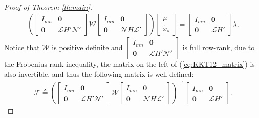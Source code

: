 \documentclass[12pt]{article}  %
\newcommand{\Fc}{{\mathcal{F}}}
\newcommand{\Nc}{{\mathcal{N}}}
\newcommand{\Wc}{{\mathcal{W}}}
\newcommand{\Lc}{{\mathcal{L}}}
\newtheorem*{proof}{\textbf{Proof}}
\begin{document}
\begin{proof}[Proof of Theorem \ref{th:main}]
\begin{align}
	\left(
	\begin{bmatrix}
	I_{mn} & \mathbf{0} \\
	\mathbf{0}  &  \Lc H{'} \Nc{'}
	\end{bmatrix}
	\Wc
	\begin{bmatrix}
	I_{mn} & \mathbf{0} \\
	\mathbf{0}  &  \Nc H \Lc{'}
	\end{bmatrix}
	\right)
	\begin{bmatrix}
	\mu \\ \tilde{x}_s
	\end{bmatrix}=
	\begin{bmatrix}
	I_{mn} & \mathbf{0} \\
	\mathbf{0}  &  \Lc H{'}
	\end{bmatrix}
	\lambda .
	\end{align}
	Notice that $\Wc$ is positive definite and $\begin{bmatrix}
	I_{mn} & \mathbf{0} \\
	\mathbf{0}  &  \Lc H{'} \Nc{'}
	\end{bmatrix}$
	is full row-rank,
	due to the Frobenius rank inequality, the matrix on the left of (\ref{eq:KKT12_matrix}) is also invertible, and thus the following matrix is well-defined:
	\begin{align}\label{eq:def_H}
	\Fc	\triangleq
	\left(
	\begin{bmatrix}
	I_{mn} & \mathbf{0} \\
	\mathbf{0}  &  \Lc H{'} \Nc{'}
	\end{bmatrix}
	\Wc
	\begin{bmatrix}
	I_{mn} & \mathbf{0} \\
	\mathbf{0}  &  \Nc H \Lc{'}
	\end{bmatrix}
	\right)^{-1}
	\begin{bmatrix}
	I_{mn} & \mathbf{0} \\ \mathbf{0} &\Lc H{'}
	\end{bmatrix}.
	\end{align}
	

\end{proof}
\end{document}
